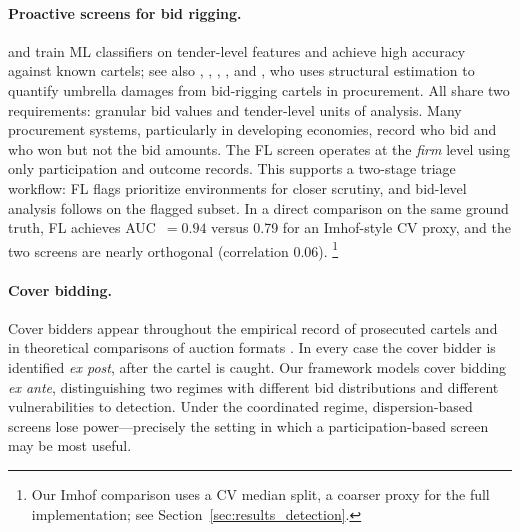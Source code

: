 \paragraph{Proactive screens for bid rigging.}
\citet{imhof2019detecting} and \citet{imhof2018screening} train ML
classifiers on tender-level features and achieve high accuracy against
known cartels; see also \citet{abrantesmetz2006a},
\citet{harrington2008detecting}, \citet{chassang2022robust},
\citet{wallimann2023machine}, and \citet{caoui2022umbrella}, who
uses structural estimation to quantify umbrella damages from
bid-rigging cartels in procurement. All share two requirements:
granular bid values and tender-level units of analysis. Many procurement systems,
particularly in developing economies, record who bid and who won but
not the bid amounts. The FL screen operates at the \emph{firm} level
using only participation and outcome records. This supports a
two-stage triage workflow: FL flags prioritize environments for
closer scrutiny, and bid-level analysis follows on the flagged
subset. In a direct
comparison on the same ground truth, FL achieves AUC~$= 0.94$ versus
0.79 for an Imhof-style CV proxy, and the two screens are nearly
orthogonal (correlation 0.06).%
\footnote{Our Imhof comparison uses a CV median split, a coarser proxy
for the full implementation; see Section~\ref{sec:results_detection}.}

\paragraph{Cover bidding.}
Cover bidders appear throughout the empirical record of prosecuted
cartels \citep{porter1999ohio, pesendorfer2000study,
asker2010leniency, marshall2012economics} and in theoretical
comparisons of auction formats \citep{athey2011comparing}. In every case the cover bidder is identified \emph{ex post}, after
the cartel is caught. Our framework models cover bidding \emph{ex
ante}, distinguishing two regimes with different bid distributions
and different vulnerabilities to detection. Under the coordinated
regime, dispersion-based screens lose power---precisely the setting
in which a participation-based screen may be most useful.

